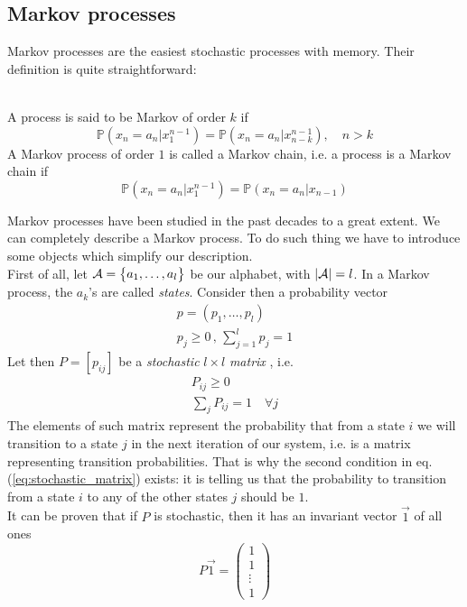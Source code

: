 \subsection{Markov processes}
Markov processes are the easiest stochastic processes with memory. Their definition is quite straightforward:
\begin{definition}
    \hfill \\
    A process is said to be Markov of order $k$ if
    \begin{equation}
        \mathbb{P}(x_n = a_n \big| x_1^{n-1}) = \mathbb{P}(x_n = a_n \big| x_{n-k}^{n-1}) , \quad n>k
    \end{equation}
    A Markov process of order $1$ is called a Markov chain, i.e. a process is a Markov chain if 
    \begin{equation}
         \mathbb{P}(x_n = a_n \big| x_1^{n-1}) = \mathbb{P}(x_n = a_n \big| x_{n-1}) 
    \end{equation}
\end{definition}
Markov processes have been studied in the past decades to a great extent. We can completely describe a Markov process. To do such thing we have to introduce some objects which simplify our description.
\\First of all, let $\mathcal{A} = \big\{ a_1, \dots, a_l \big\}$ be our alphabet, with $|\mathcal{A}| = l$. In a Markov process, the $a_k$'s are called \textit{states}. Consider then a probability vector 
\begin{gather}
    p = (p_1, \dots, p_l) \nonumber \\
    p_j \geq 0 \, , \, \sum_{j=1}^l p_j = 1
\end{gather}
Let then $P = [p_{ij}]$ be a \textit{stochastic} $l \times l$ \textit{matrix} , i.e.
\begin{gather} 
\label{eq:stochastic_matrix}
    P_{ij} \geq 0 \nonumber \\
    \sum_j P_{ij} = 1 \quad \forall j
\end{gather}
The elements of such matrix represent the probability that from a state $i$ we will transition to a state $j$ in the next iteration of our system, i.e. is a matrix representing transition probabilities. That is why the second condition in eq. (\ref{eq:stochastic_matrix}) exists: it is telling us that the probability to transition from a state $i$ to any of the other states $j$ should be $1$.
\\It can be proven that if $P$ is stochastic, then it has an invariant vector $\vec{1}$ of all ones
\begin{equation*}
    P \vec{1} = 
    \begin{pmatrix}
        1 \\
        1 \\
        \vdots \\
        1
    \end{pmatrix}
\end{equation*}
